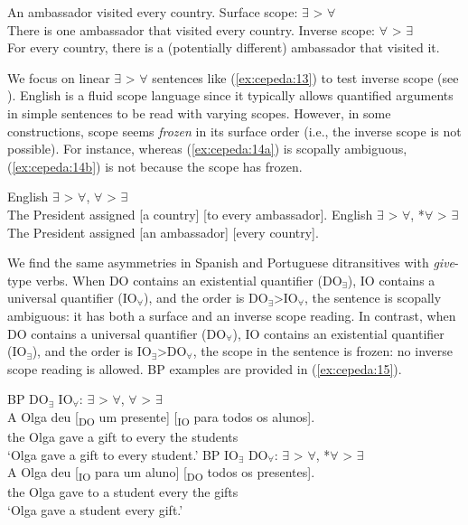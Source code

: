 \documentclass[output=paper,colorlinks,citecolor=brown,nonflat]{./langscibook}
\begin{document}
\ea%
    \label{ex:cepeda:13} 
    An ambassador visited every country.
	\ea\label{ex:cepeda:13a}
	Surface scope: $\exists$ > $\forall$\\
	There is one ambassador that visited every country.
	\ex\label{ex:cepeda:13b} Inverse scope: $\forall$ > $\exists$\\
	For every country, there is a (potentially different) ambassador that visited it.
	\z
\z

We focus on linear $\exists$ > $\forall$ sentences like (\ref{ex:cepeda:13}) to test inverse scope (see \citealt{Larson2014}). English is a fluid scope language since it typically allows quantified arguments in simple sentences to be read with varying scopes. However, in some constructions, scope seems \textit{frozen} in its surface order (i.e., the inverse scope is not possible). For instance, whereas (\ref{ex:cepeda:14a}) is scopally ambiguous, (\ref{ex:cepeda:14b}) is not because the scope has frozen.

\ea%
    \label{ex:cepeda:14}
	\ea\label{ex:cepeda:14a}
	English $\exists$ > $\forall$, $\forall$ > $\exists$\\
	The President assigned [a country] [to every ambassador].
	\ex\label{ex:cepeda:14b}
	English $\exists$ > $\forall$, *$\forall$ > $\exists$\\
	The President assigned [an ambassador] [every country].
	\z
\z

We find the same asymmetries in Spanish and Portuguese ditransitives with \textit{give}-type verbs. When DO contains an existential quantifier (DO$_∃$), IO contains a universal quantifier (IO$_∀$), and the order is DO$_∃$>IO$_∀$, the sentence is scopally ambiguous: it has both a surface and an inverse scope reading. In contrast, when DO contains a universal quantifier (DO$_∀$), IO contains an existential quantifier (IO$_∃$), and the order is IO$_∃$>DO$_∀$, the scope in the sentence is frozen: no inverse scope reading is allowed. BP examples are provided in (\ref{ex:cepeda:15}).

\ea%
    \label{ex:cepeda:15}
	\ea\label{ex:cepeda:15a}
	BP DO$_∃$ IO$_∀$: $\exists$ > $\forall$, $\forall$ > $\exists$\\
	\gll A Olga deu [\textsubscript{DO} um presente] [\textsubscript{IO} para todos os  alunos].\\
		the Olga gave \hspaceThis{[\textsubscript{DO}} a    gift \hspaceThis{[\textsubscript{IO}} to    every the students\\
	\glt ‘Olga gave a gift to every student.’
	\ex\label{ex:cepeda:15b}
	BP IO$_∃$  DO$_∀$: $\exists$ > $\forall$, *$\forall$ > $\exists$\\
	\gll A Olga deu [\textsubscript{IO} para um aluno] [\textsubscript{DO} todos os presentes].\\
		the Olga gave \hspaceThis{[\textsubscript{IO}} to a student \hspaceThis{[\textsubscript{DO}} every the gifts\\
	\glt ‘Olga gave a student every gift.’
	\z
\z
\end{document}
